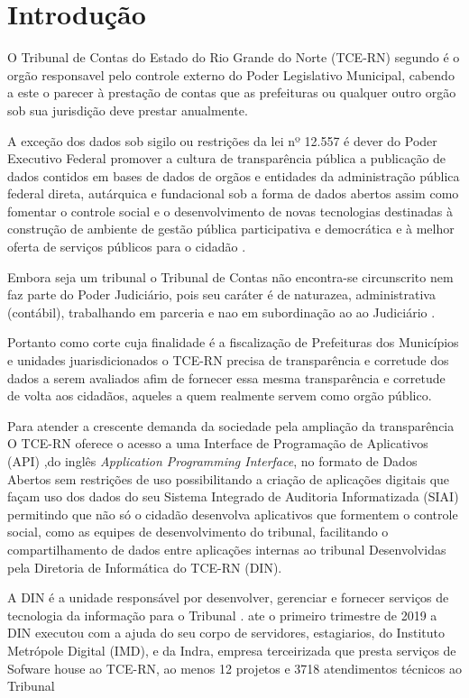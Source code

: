 \chapter[Introdução]{Introdução}
\label{ch:introducao}

  O Tribunal de Contas do Estado do Rio Grande do Norte (TCE-RN) segundo \cite{Legislativa} é o orgão responsavel pelo controle externo do Poder Legislativo Municipal, cabendo a este o parecer à prestação de contas que as prefeituras ou qualquer outro orgão sob sua jurisdição deve prestar anualmente.

  A exceção dos dados sob sigilo ou restrições da lei nº 12.557 \cite{lei_12527} é dever do Poder Executivo Federal promover a cultura de transparência pública a publicação de dados contidos em bases de dados de orgãos e entidades da administração pública federal direta, autárquica e fundacional sob a forma de dados abertos assim como fomentar o controle social e o desenvolvimento de novas tecnologias destinadas à construção de ambiente de gestão pública participativa e democrática e à melhor oferta de serviços públicos para o cidadão \cite{dec_8777}.

  Embora seja um tribunal o Tribunal de Contas não encontra-se circunscrito nem faz parte do Poder Judiciário, pois seu caráter é de naturazea, administrativa (contábil), trabalhando em parceria e nao em subordinação ao  ao Judiciário \cite{barreto_tribunais}.

  Portanto como corte cuja finalidade é a fiscalização de Prefeituras dos Municípios e unidades juarisdicionados o TCE-RN precisa de transparência e corretude dos dados a serem avaliados afim de fornecer essa mesma transparência e corretude de volta aos cidadãos, aqueles a quem realmente servem como orgão público.

  Para atender a crescente demanda da sociedade pela ampliação da transparência O TCE-RN oferece o acesso a uma Interface de Programação de Aplicativos (API) ,do inglês \textit{Application Programming Interface}, no formato de Dados Abertos sem restrições de uso possibilitando a criação de aplicações digitais \cite{dados_abertos_tcern} que façam uso dos dados do seu Sistema Integrado de Auditoria Informatizada (SIAI) permitindo que não só o cidadão desenvolva aplicativos que formentem o controle social, como as equipes de desenvolvimento do tribunal, facilitando o compartilhamento de dados entre aplicações internas ao tribunal Desenvolvidas pela Diretoria de Informática do TCE-RN (DIN).

  A DIN é a unidade responsável por desenvolver, gerenciar e fornecer serviços de tecnologia da informação para o Tribunal \cite{relatorio_trimestral}. ate o primeiro trimestre de 2019 a DIN executou com a ajuda do seu corpo de servidores, estagiarios, do Instituto Metrópole Digital (IMD), e da Indra, empresa terceirizada que presta serviços de Sofware house ao TCE-RN, ao menos 12 projetos e 3718 atendimentos técnicos ao Tribunal



